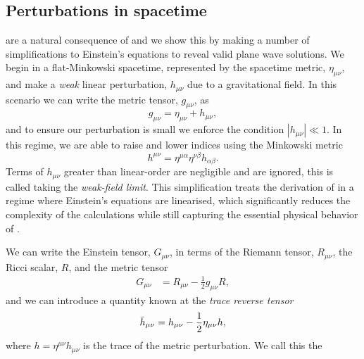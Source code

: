 \subsection{\label{1:sec:perturbations}Perturbations in spacetime}

\Gws are a natural consequence of \GR and we show this by making a number of simplifications to Einstein's equations to reveal valid plane wave solutions. We begin in a flat-Minkowski spacetime, represented by the spacetime metric, $\eta_{\mu\nu}$, and make a \textit{weak} linear perturbation, $h_{\mu\nu}$ due to a gravitational field. In this scenario we can write the metric tensor, $g_{\mu\nu}$, as
%
\begin{equation}
    g_{\mu\nu} = \eta_{\mu\nu} + h_{\mu\nu},
    \label{1:eq:metric_perturbation}
\end{equation}
%
and to ensure our perturbation is small we enforce the condition $|h_{\mu\nu}| \ll 1$. In this regime, we are able to raise and lower indices using the Minkowski metric
%
\begin{equation}
    h^{\mu\nu} = \eta^{\mu\alpha}\eta^{\nu\beta}h_{\alpha\beta}.
    \label{1:eq:raise_lowering_indices}
\end{equation}
%
Terms of $h_{\mu\nu}$ greater than linear-order are negligible and are ignored, this is called taking the \textit{weak-field limit}. This simplification treats the derivation of \gws in a regime where Einstein's equations are linearised, which significantly reduces the complexity of the calculations while still capturing the essential physical behavior of \gws.

We can write the Einstein tensor, $G_{\mu\nu}$, in terms of the Riemann tensor, $R_{\mu\nu}$, the Ricci scalar, $R$, and the metric tensor
%
\begin{align}
    G_{\mu\nu} &= R_{\mu\nu} - \frac{1}{2}g_{\mu\nu}R,
    \label{1:eq:g_munu_riemann}
\end{align}
%
and we can introduce a quantity known at the \textit{trace reverse tensor}
%
\begin{equation}
    \Bar{h}_{\mu\nu} = h_{\mu\nu} - \frac{1}{2} \eta_{\mu\nu}h,
\end{equation}
%
where $h = \eta^{\mu\nu}h_{\mu\nu}$ is the trace of the metric perturbation. We call this the 


